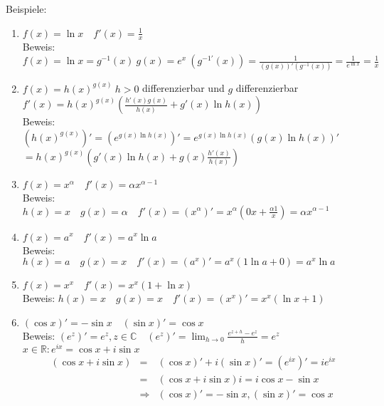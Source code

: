 \documentclass[ngerman,titlepage,twoside, parskip=half*]{scrreprt}
\newcommand*{\R}{\mathbb{R}}
\newcommand*{\C}{\mathbb{C}}
\theoremstyle{break}
\theoremstyle{nonumberbreak}
\begin{document}
Beispiele:
\begin{enumerate}[(1)]
  \item $f(x)=\ln x\quad f'(x)=\frac{1}{x}$\\
    Beweis: $f(x)=\ln x=g^{-1}(x)\ g(x)=e^x\ (g^{-1'}(x))=
    \frac{1}{(g(x))'(g^{-1}(x))}=\frac{1}{e^{\ln x}}=\frac{1}{x}$
  \item $f(x)=h(x)^{g(x)}\ h>0$ differenzierbar und $g$ differenzierbar\\
    $f'(x)=h(x)^{g(x)}(\frac{h'(x)g(x)}{h(x)}+g'(x)\ln h(x))$\\
    Beweis: $(h(x)^{g(x)})'=(e^{g(x)\ln h(x)})'=e^{g(x)\ln h(x)}
    (g(x)\ln h(x))'$\\
    $=h(x)^{g(x)}(g'(x)\ln h(x)+g(x)\frac{h'(x)}{h(x)})$
  \item $f(x) = x^\alpha \quad f'(x) = \alpha x^{\alpha-1}$\\
    Beweis: $h(x)=x\quad g(x)=\alpha\quad f'(x)=(x^\alpha)'=x^\alpha
    (0x+\frac{\alpha 1}{x})=\alpha x^{\alpha-1}$
  \item $f(x) = a^x \quad f'(x) = a^x \ln a$\\
    Beweis: $h(x)=a\quad g(x)=x\quad f'(x)=(a^x)'=a^x(1\ln a+0)=a^x\ln a$
  \item $f(x) = x^x \quad f'(x) = x^x(1+\ln x)$\\
    Beweis: $h(x)=x\quad g(x)=x\quad f'(x)=(x^x)'=x^x(\ln x+1)$
  \item $(\cos x)'=-\sin x\quad (\sin x)'=\cos x$\\
    Beweis: $(e^z)'=e^z, z\in\C\quad (e^z)'=\lim_{h\rightarrow 0}
    \frac{e^{z+h}-e^z}{h}=e^z$\\
    $x\in\R\colon e^{ix}=\cos x+i\sin x$
    \begin{align*}
      (\cos x+i\sin x) & = & (\cos x)'+i(\sin x)'=(e^{ix})'=ie^{ix}\\
      & = & (\cos x+i\sin x)i=i\cos x-\sin x\\
      & \Rightarrow & (\cos x)'=-\sin x, (\sin x)'=\cos x
    \end{align*}
\end{enumerate}
\end{document}
